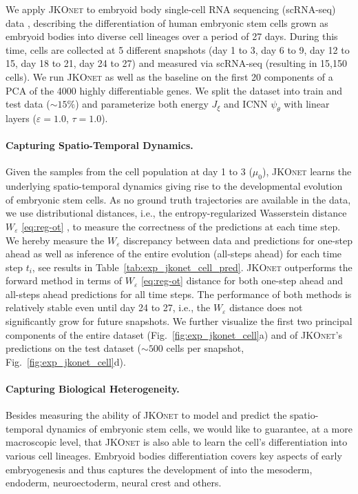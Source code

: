 We apply \textsc{JKOnet} to embryoid body single-cell RNA sequencing (scRNA-seq) data \citep{moon2019visualizing}, describing the differentiation of human embryonic stem cells grown as embryoid bodies into diverse cell lineages over a period of 27 days. During this time, cells are collected at 5 different snapshots (day 1 to 3, day 6 to 9, day 12 to 15, day 18 to 21, day 24 to 27) and measured via scRNA-seq (resulting in 15,150 cells).
We run \textsc{JKOnet} as well as the baseline on the first 20 components of a \acrfull{PCA} of the 4000 highly differentiable genes.
We split the dataset into train and test data ($\sim 15 \%$) and parameterize both energy $J_\xi$ and ICNN $\psi_\theta$ with linear layers ($\varepsilon = 1.0$, $\tau = 1.0$).

\paragraph{Capturing Spatio-Temporal Dynamics.}
Given the samples from the cell population at day 1 to 3 ($\mu_0$), \textsc{JKOnet} learns the underlying spatio-temporal dynamics giving rise to the developmental evolution of embryonic stem cells. 
As no ground truth trajectories are available in the data, we use distributional distances, i.e., the entropy-regularized Wasserstein distance $W_\varepsilon$ \eqref{eq:reg-ot} \citep{flamary2021pot}, to measure the correctness of the predictions at each time step.
We hereby measure the $W_\varepsilon$ discrepancy between data and predictions for one-step ahead as well as inference of the entire evolution (all-steps ahead) for each time step $t_i$, see results in Table~\ref{tab:exp_jkonet_cell_pred}. \textsc{JKOnet} outperforms the forward method in terms of $W_\varepsilon$ \eqref{eq:reg-ot} distance for both one-step ahead and all-steps ahead predictions for all time steps. 
The performance of both methods is relatively stable even until day 24 to 27, i.e., the $W_\varepsilon$ distance does not significantly grow for future snapshots.
We further visualize the first two principal components of the entire dataset (Fig.~\ref{fig:exp_jkonet_cell}a) and of \textsc{JKOnet}'s predictions on the test dataset ($\sim 500$ cells per snapshot, Fig.~\ref{fig:exp_jkonet_cell}d). 

\paragraph{Capturing Biological Heterogeneity.}
Besides measuring the ability of \textsc{JKOnet} to model and predict the spatio-temporal dynamics of embryonic stem cells, we would like to guarantee, at a more macroscopic level, that \textsc{JKOnet} is also able to learn the cell's differentiation into various cell lineages.
Embryoid bodies differentiation covers key aspects of early embryogenesis and thus captures the development of  into the mesoderm, endoderm, neuroectoderm, neural crest and others.

